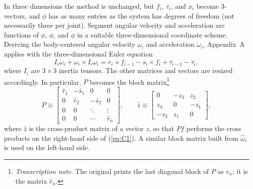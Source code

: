 \documentclass[11pt]{article}
\newcommand{\tnote}[1]{\footnote{\textit{Transcription note.} #1}}
\begin{document}
In three dimensions the method is unchanged, but $f_i$, $\tau_i$, and $x_i$
become 3-vectors, and $\phi$ has as many entries as the system has degrees of
freedom (not necessarily three per joint). Segment angular velocity and
acceleration are functions of $\phi$, $\dot{\phi}$, and $\ddot{\phi}$ in a
suitable three-dimensional coordinate scheme. Deriving the body-centered
angular velocity $\omega_i$ and acceleration $\dot{\omega}_i$, Appendix~A
applies with the three-dimensional Euler equation
\begin{equation}
I_i\dot{\omega}_i + \omega_i\times I_i\omega_i
= r_i\times f_{i-1} - s_i\times f_i + \tau_{i-1} - \tau_i,
\label{eq:C1}
\end{equation}
where $I_i$ are $3\times3$ inertia tensors. The other matrices and vectors
are resized accordingly. In particular, $P$ becomes the block
matrix\tnote{The original prints the last diagonal block of $P$ as $r_n$; it
is the matrix $\hat{r}_n$.}
\[
P \equiv \begin{bmatrix}
\hat{r}_1 & -\hat{s}_1 & 0 & 0\\
0 & \hat{r}_2 & -\hat{s}_2 & 0\\
0 & 0 & \ddots & \vdots\\
0 & 0 & \cdots & \hat{r}_n
\end{bmatrix},
\qquad
\hat{z} \equiv \begin{bmatrix}
0 & -z_3 & z_2\\
z_3 & 0 & -z_1\\
-z_2 & z_1 & 0
\end{bmatrix},
\]
where $\hat{z}$ is the cross-product matrix of a vector $z$, so that $P f$
performs the cross products on the right-hand side of (\ref{eq:C1}). A
similar block matrix built from $\hat{\omega}_i$ is used on the left-hand
side.
\end{document}
